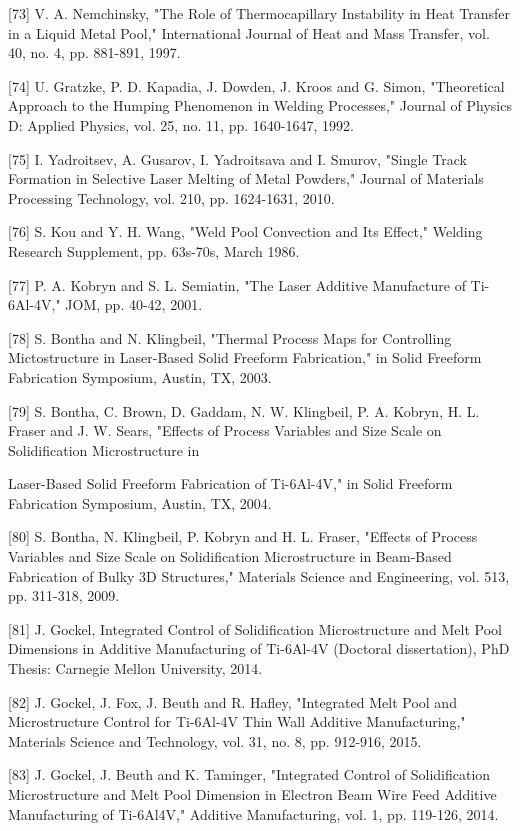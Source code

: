 \documentclass[10pt]{article}
\begin{document}
[73] V. A. Nemchinsky, "The Role of Thermocapillary Instability in Heat Transfer in a Liquid Metal Pool," International Journal of Heat and Mass Transfer, vol. 40, no. 4, pp. 881-891, 1997.

[74] U. Gratzke, P. D. Kapadia, J. Dowden, J. Kroos and G. Simon, "Theoretical Approach to the Humping Phenomenon in Welding Processes," Journal of Physics D: Applied Physics, vol. 25, no. 11, pp. 1640-1647, 1992.

[75] I. Yadroitsev, A. Gusarov, I. Yadroitsava and I. Smurov, "Single Track Formation in Selective Laser Melting of Metal Powders," Journal of Materials Processing Technology, vol. 210, pp. 1624-1631, 2010.

[76] S. Kou and Y. H. Wang, "Weld Pool Convection and Its Effect," Welding Research Supplement, pp. 63s-70s, March 1986.

[77] P. A. Kobryn and S. L. Semiatin, "The Laser Additive Manufacture of Ti-6Al-4V," JOM, pp. 40-42, 2001.

[78] S. Bontha and N. Klingbeil, "Thermal Process Maps for Controlling Mictostructure in Laser-Based Solid Freeform Fabrication," in Solid Freeform Fabrication Symposium, Austin, TX, 2003.

[79] S. Bontha, C. Brown, D. Gaddam, N. W. Klingbeil, P. A. Kobryn, H. L. Fraser and J. W. Sears, "Effects of Process Variables and Size Scale on Solidification Microstructure in

Laser-Based Solid Freeform Fabrication of Ti-6Al-4V," in Solid Freeform Fabrication Symposium, Austin, TX, 2004.

[80] S. Bontha, N. Klingbeil, P. Kobryn and H. L. Fraser, "Effects of Process Variables and Size Scale on Solidification Microstructure in Beam-Based Fabrication of Bulky 3D Structures," Materials Science and Engineering, vol. 513, pp. 311-318, 2009.

[81] J. Gockel, Integrated Control of Solidification Microstructure and Melt Pool Dimensions in Additive Manufacturing of Ti-6Al-4V (Doctoral dissertation), PhD Thesis: Carnegie Mellon University, 2014.

[82] J. Gockel, J. Fox, J. Beuth and R. Hafley, "Integrated Melt Pool and Microstructure Control for Ti-6Al-4V Thin Wall Additive Manufacturing," Materials Science and Technology, vol. 31, no. 8, pp. 912-916, 2015.

[83] J. Gockel, J. Beuth and K. Taminger, "Integrated Control of Solidification Microstructure and Melt Pool Dimension in Electron Beam Wire Feed Additive Manufacturing of Ti-6Al4V," Additive Manufacturing, vol. 1, pp. 119-126, 2014.
\end{document}
